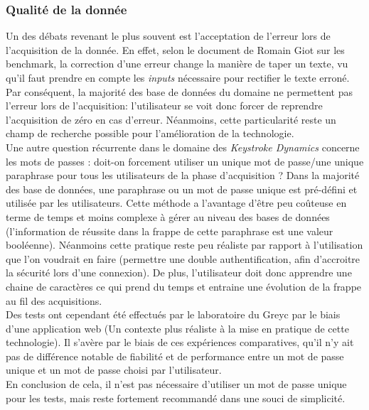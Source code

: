 \subsubsection{Qualité de la donnée}

Un des débats revenant le plus souvent est l'acceptation de l'erreur lors de l'acquisition de la donnée. En effet, selon le document de Romain Giot sur les benchmark\cite{giotBenchmark}, la correction d'une erreur change la manière de taper un texte, vu qu'il faut  prendre en compte les \textit{inputs} nécessaire pour rectifier le texte erroné. Par conséquent, la majorité des base de données du domaine ne permettent pas l'erreur lors de l'acquisition: l'utilisateur se voit donc forcer de reprendre l'acquisition de zéro en cas d'erreur. Néanmoins, cette particularité reste un champ de recherche possible pour l'amélioration de la technologie.\\

Une autre question récurrente dans le domaine des \textit{Keystroke Dynamics} concerne les mots de passes : doit-on forcement utiliser un unique mot de passe/une unique paraphrase pour tous les utilisateurs de la phase d'acquisition ? Dans la majorité des base de données, une paraphrase ou un mot de passe unique est pré-défini et utilisée par les utilisateurs. Cette méthode a l'avantage d'être peu coûteuse en terme de temps et moins complexe à gérer au niveau des bases de données (l'information de réussite dans la frappe de cette paraphrase est une valeur booléenne). Néanmoins cette pratique reste peu réaliste par rapport à l'utilisation que l'on voudrait en faire (permettre une double authentification, afin d'accroitre la sécurité lors d'une connexion). De plus, l'utilisateur doit donc apprendre une chaine de caractères ce qui prend du temps et entraine une évolution de la frappe au fil des acquisitions.\\

Des tests ont cependant été effectués par le laboratoire du Greyc\cite{giotWeb} par le biais d'une application web (Un contexte plus réaliste à la mise en pratique de cette technologie). Il s'avère par le biais de ces expériences comparatives, qu'il n'y ait pas de différence notable de fiabilité et de performance entre un mot de passe unique et un mot de passe choisi par l'utilisateur.\\

En conclusion de cela, il n'est pas nécessaire d'utiliser un mot de passe unique pour les tests, mais reste fortement recommandé dans une souci de simplicité.\\

